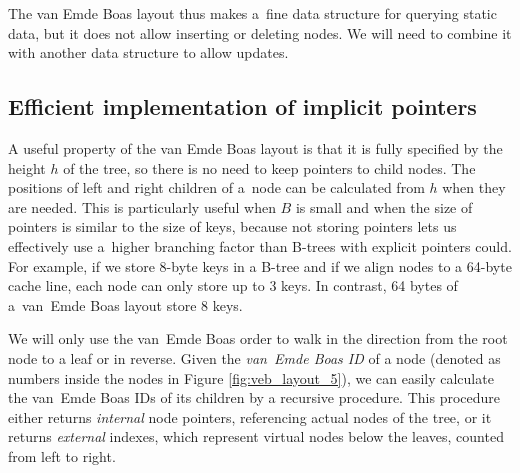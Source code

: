 The van Emde Boas layout thus makes a~fine data structure for querying static
data, but it does not allow inserting or deleting nodes. We will need
to combine it with another data structure to allow updates.

\subsection{Efficient implementation of implicit pointers}
A useful property of the van Emde Boas layout is that it is fully specified
by the height $h$ of the tree, so there is no need to keep pointers to child
nodes. The positions of left and right children of a~node can be calculated
from $h$ when they are needed.
This is particularly useful when $B$ is small and when the size of pointers
is similar to the size of keys, because not storing pointers lets us
effectively use a~higher branching factor than B-trees with explicit
pointers could.
For example, if we store 8-byte keys in a B-tree and if we align nodes to
a 64-byte cache line, each node can only store up to 3 keys. In contrast,
64 bytes of a~van~Emde Boas layout store 8 keys.

We will only use the van~Emde Boas order to walk in the direction from
the root node to a leaf or in reverse.
Given the \emph{van~Emde Boas ID} of a node (denoted as numbers
inside the nodes in Figure \ref{fig:veb_layout_5}),
we can easily calculate the van~Emde Boas IDs of its children by
a recursive procedure. This procedure either returns \emph{internal} node
pointers, referencing actual nodes of the tree, or it returns \emph{external}
indexes, which represent virtual nodes below the leaves, counted from left
to right.

